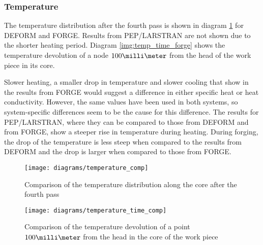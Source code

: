 \subsubsection{Temperature}

The temperature distribution after the fourth pass is shown in diagram \ref{img:temp_comp} for DEFORM and FORGE. Results from PEP/LARSTRAN are not shown due to the shorter heating period. Diagram \ref{img:temp_time_forge} shows the temperature devolution of a node $100\milli\meter$ from the head of the work piece in its core.

Slower heating, a smaller drop in temperature and slower cooling that show in the results from FORGE would suggest a difference in either specific heat or heat conductivity. However, the same values have been used in both systems, so system-specific differences seem to be the cause for this difference. The results for PEP/LARSTRAN, where they can be compared to those from DEFORM and from FORGE, show a steeper rise in temperature during heating. During forging, the drop of the temperature is less steep when compared to the results from DEFORM and the drop is larger when compared to those from FORGE.

\begin{figure}[tb]
  \centering
  \texttt{[image: diagrams/temperature\_comp]}
  \caption{Comparison of the temperature distribution along the core after the fourth pass}
  \label{img:temp_comp}
\end{figure}


\begin{figure}[tb]
  \centering
  \texttt{[image: diagrams/temperature\_time\_comp]}
  \caption{Comparison of the temperature devolution of a point $100\milli\meter$ from the head in the core of the work piece}
  \label{img:temp_time_comp}
\end{figure}

\clearpage
